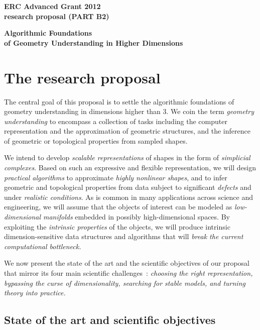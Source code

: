 \thispagestyle{empty}

\mbox{}\vspace{-3.5cm}

\begin{center}
{\Large
{\bf ERC Advanced Grant 2012 \\ research proposal (PART B2)}}
\vspace{1cm}

{\LARGE {\bf  Algorithmic Foundations \\ of 
Geometry Understanding in Higher Dimensions}

\vspace{3mm} 

}
\end{center}
\section{The research proposal}

The central goal of this proposal is to settle the algorithmic
foundations of geometry understanding in dimensions higher than 3.  We
coin the term {\em geometry understanding} to encompass a collection
of tasks including the computer representation and the approximation
of geometric structures, and the inference of geometric or topological
properties from sampled
shapes.  


We intend to develop {\em scalable representations} of shapes  in the form of {\em simplicial complexes}.
Based on such an expressive and flexible representation, we will design  {\em
practical algorithms} to approximate {\em highly nonlinear shapes}, and to
infer geometric and topological properties from data subject to
significant {\em defects} and under {\em realistic conditions}.
As is common in many applications across science and engineering, we
will assume that the objects of interest can be modeled as {\em
  low-dimensional manifolds} embedded in possibly high-dimensional
spaces. By exploiting the {\em intrinsic properties} of the objects,
we will produce intrinsic dimension-sensitive data structures and algorithms
that will {\em break the current computational
bottleneck.}  


We now present the state of the art and the scientific objectives of our proposal that mirror its four main scientific challenges~: {\em choosing the right representation, bypassing the curse of dimensionality, searching for stable models, and turning theory into practice.}


\subsection{State of the art and scientific objectives}


